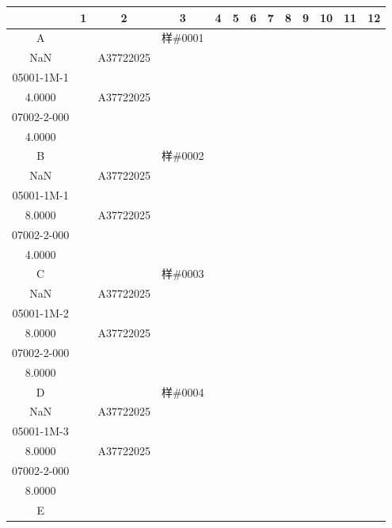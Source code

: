 \documentclass[UTF8,10pt,a4paper,fontset=fandol]{ctexart}
\newcommand{\fieldvalue}[1]{#1}
\begin{document}
\begin{tabular}{c|*{12}{c|}}
 &1&2&3&4&5&6&7&8&9&10&11&12\\ \hline
A&&&%
\fieldvalue{\scriptsize 样\#0001\\NaN}&
&%
\fieldvalue{\scriptsize A37722025\\05001-1M-1\\4.0000}&
&%
\fieldvalue{\scriptsize A37722025\\07002-2-000\\4.0000}&
&&&&\\ \hline
B&&&%
\fieldvalue{\scriptsize 样\#0002\\NaN}&
&%
\fieldvalue{\scriptsize A37722025\\05001-1M-1\\8.0000}&
&%
\fieldvalue{\scriptsize A37722025\\07002-2-000\\4.0000}&
&&&&\\ \hline
C&&&%
\fieldvalue{\scriptsize 样\#0003\\NaN}&
&%
\fieldvalue{\scriptsize A37722025\\05001-1M-2\\8.0000}&
&%
\fieldvalue{\scriptsize A37722025\\07002-2-000\\8.0000}&
&&&&\\ \hline
D&&&%
\fieldvalue{\scriptsize 样\#0004\\NaN}&
&%
\fieldvalue{\scriptsize A37722025\\05001-1M-3\\8.0000}&
&%
\fieldvalue{\scriptsize A37722025\\07002-2-000\\8.0000}&
&&&&\\ \hline
E&&&%

\end{tabular}
\end{document}
